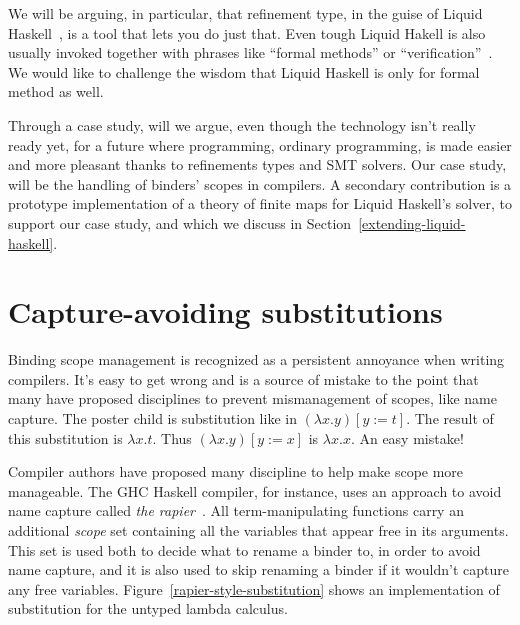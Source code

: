 \documentclass[sigconf, anonymous, review]{acmart}
\begin{document}
We will be arguing, in particular, that refinement type, in the guise of Liquid
Haskell~\cite{vazou14b}, is a tool that lets you do just that. Even tough Liquid
Hakell is also usually invoked together with phrases like ``formal methods'' or
``verification''~\cite{vazou14,lehmann21,liu20,redmond23}. We would like to
challenge the wisdom that Liquid Haskell is only for formal method as well.

Through a case study, will we argue, even though the technology isn't really
ready yet, for a future where programming, ordinary programming, is made easier
and more pleasant thanks to refinements types and SMT solvers. Our case study,
will be the handling of binders' scopes in compilers. A secondary contribution
is a prototype implementation of a theory of finite maps for Liquid Haskell's
solver, to support our case study, and which we discuss in
Section~\ref{extending-liquid-haskell}.

\section{Capture-avoiding substitutions}
\label{capture-avoiding-substitution}

Binding scope management is recognized as a persistent annoyance when writing compilers.
It's easy to get wrong and is a source of mistake to the point that many have
proposed disciplines to prevent mismanagement of scopes, like name capture.
The poster child is substitution like in
$(\lambda x. y)[y:=t]$. The result of this substitution is $\lambda x. t$.
Thus $(\lambda x. y)[y:=x]$ is $\lambda x. x$. An easy mistake!

Compiler authors have proposed many discipline to help make scope more
manageable.
The GHC Haskell compiler, for instance, uses an approach to avoid name capture called
\textit{the rapier}~\cite{peytonjones02secrets}. All term-manipulating functions
carry an additional \textit{scope} set containing all the
variables that appear free in its arguments. This set is
used both to decide what to rename a binder to, in order to avoid name capture,
and it is also used to skip renaming a binder if it wouldn't capture any free
variables. Figure~\ref{rapier-style-substitution} shows an implementation of
substitution
for the untyped lambda calculus.
\end{document}
